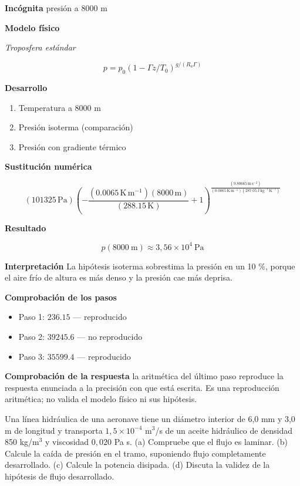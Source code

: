 \documentclass[10pt,openany]{book}
\begin{document}
\noindent\textbf{Incógnita}
presión a 8000 m

\noindent\textbf{Modelo físico}

\noindent\textit{Troposfera estándar}

\[
p = p_0\left(1 - \Gamma z/T_0\right)^{g/(R_a\Gamma)}
\]

\noindent\textbf{Desarrollo}
\begin{enumerate}
\item
Temperatura a 8000 m
\item
Presión isoterma (comparación)
\item
Presión con gradiente térmico
\end{enumerate}

\noindent\textbf{Sustitución numérica}

\[
\left(101325\,\mathrm{Pa}\right) \left(- \frac{\left(0.0065\,\mathrm{K}\,\mathrm{m}^{-1}\right) \left(8000\,\mathrm{m}\right)}{\left(288.15\,\mathrm{K}\right)} + 1\right)^{\frac{\left(9.80665\,\mathrm{m}\,\mathrm{s}^{-2}\right)}{\left(0.0065\,\mathrm{K}\,\mathrm{m}^{-1}\right) \left(287.05\,\mathrm{J}\,\mathrm{kg}^{-1}\,\mathrm{K}^{-1}\right)}}
\]

\noindent\textbf{Resultado}

\[
p(8000\ \mathrm{m}) \approx 3{,}56\times 10^{4}\ \mathrm{Pa}
\]

\noindent\textbf{Interpretación}
La hipótesis isoterma sobrestima la presión en un 10 \%, porque el aire frío de altura es más denso y la presión cae más deprisa.

\noindent\textbf{Comprobación de los pasos}
\begin{itemize}
\item Paso 1: $236.15$ — reproducido
\item Paso 2: $39245.6$ — no reproducido
\item Paso 3: $35599.4$ — reproducido
\end{itemize}

\noindent\textbf{Comprobación de la respuesta} la aritmética del último paso reproduce la respuesta enunciada a la precisión con que está escrita. Es una reproducción aritmética; no valida el modelo físico ni sus hipótesis.

Una línea hidráulica de una aeronave tiene un diámetro interior de 6,0 mm y 3,0 m de longitud y transporta \(1{,}5\times 10^{-4}\) m\(^3\)/s de un aceite hidráulico de densidad 850 kg/m\(^3\) y viscosidad \(0{,}020\) Pa s. (a) Compruebe que el flujo es laminar. (b) Calcule la caída de presión en el tramo, suponiendo flujo completamente desarrollado. (c) Calcule la potencia disipada. (d) Discuta la validez de la hipótesis de flujo desarrollado.
\end{document}
